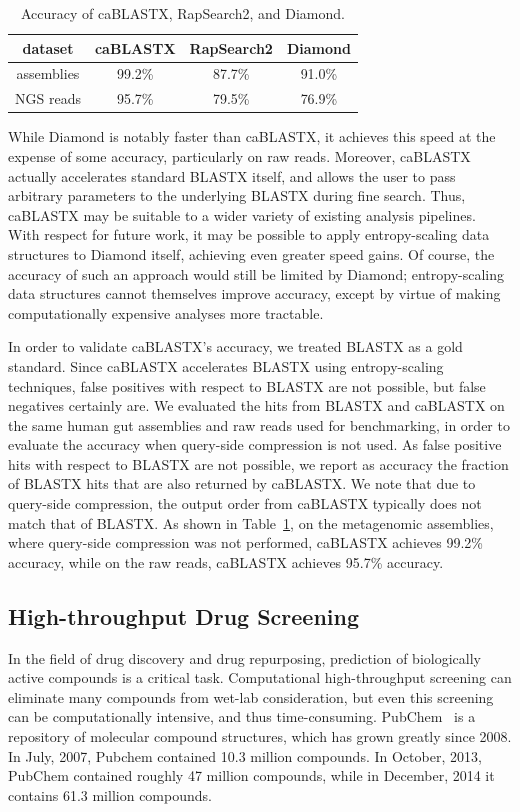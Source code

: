 \documentclass[review,preprint,12pt]{elsarticle}
\renewcommand{\cite}{\citep} %
\theoremstyle{definition}
\theoremstyle{remark}
\numberwithin{equation}{section}
\begin{document}
\begin{table}
\caption{Accuracy of caBLASTX, RapSearch2, and Diamond.\label{mgacc}}
\begin{tabular}{cccc}
\hline
dataset & caBLASTX & RapSearch2 & Diamond \\
\hline
assemblies & 99.2\% & 87.7\% & 91.0\% \\
\hline
NGS reads & 95.7\% & 79.5\% & 76.9\% \\
\hline
\end{tabular}
\end{table}

While Diamond is notably faster than caBLASTX, it achieves this speed at the
expense of some accuracy, particularly on raw reads.
Moreover, caBLASTX actually accelerates standard BLASTX itself, and allows the
user to pass arbitrary parameters to the underlying BLASTX during fine search.
Thus, caBLASTX may be suitable to a wider variety of existing analysis 
pipelines.
With respect for future work, it may be possible to apply entropy-scaling data
structures to Diamond itself, achieving even greater speed gains.
Of course, the accuracy of such an approach would still be limited by Diamond; 
entropy-scaling data structures cannot themselves improve accuracy,
except by virtue of making computationally expensive analyses more tractable.


In order to validate caBLASTX's accuracy, we treated BLASTX as a gold standard. 
Since caBLASTX accelerates BLASTX
using entropy-scaling techniques, false positives with respect to BLASTX are 
not possible, but false negatives certainly are.
We evaluated the hits from BLASTX and caBLASTX on the same human gut
assemblies and raw reads used for benchmarking, in order to evaluate the accuracy when
query-side compression is not used.
As false positive hits with respect to BLASTX are not possible, we report as 
accuracy the fraction of BLASTX hits that are also returned by caBLASTX.
We note that due to query-side compression, the output order from caBLASTX 
typically does not match that of BLASTX.
As shown in Table~\ref{mgacc}, on the metagenomic assemblies, where query-side 
compression was not performed, caBLASTX achieves 99.2\% accuracy, while on the 
raw reads, caBLASTX achieves 95.7\% accuracy.


\subsection{High-throughput Drug Screening}

In the field of drug discovery and drug repurposing, prediction of biologically 
active compounds is a critical task. 
Computational high-throughput screening can eliminate many compounds from 
wet-lab consideration, but even this screening can be computationally 
intensive, and thus time-consuming.
PubChem~\cite{bolton2008pubchem} is a repository of molecular compound 
structures, 
which has grown greatly since 2008. 
In July, 2007, Pubchem contained 10.3 million compounds.
In October, 2013, PubChem contained roughly 47 million compounds, while
in December, 2014 it contains 61.3 million compounds.
\end{document}
